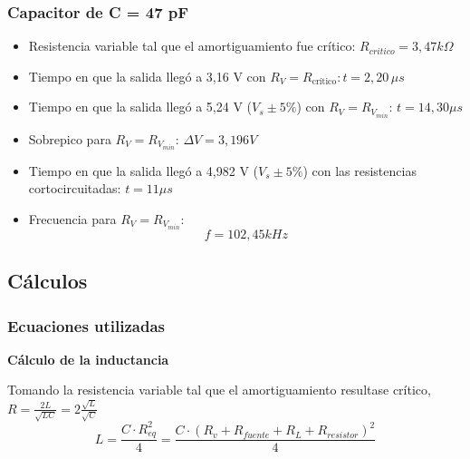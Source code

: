 \documentclass{article}
\begin{document}
        \par
        \subsubsection*{Capacitor de C = 47 pF}
            \begin{itemize}
                \item Resistencia variable tal que el amortiguamiento fue crítico: $ R_{critico} = 3,47 k\Omega $ %
                \item Tiempo en que la salida llegó a 3,16 V con $ R_V = R_{\text{crítico}} \colon t = 2,20 \, \mu s$ %
                \item Tiempo en que la salida llegó a 5,24 V ($V_s \pm 5\% $) con $ R_V=R_{V_{min}}$: $ t = 14,30 \mu s$ %
                \item Sobrepico para $R_V = R_{V_{min}}$: $ \Delta V = 3,196 V $
                \item Tiempo en que la salida llegó a 4,982 V ($V_s \pm 5\% $) con las resistencias cortocircuitadas: $ t = 11 \mu s$ %
                \item Frecuencia para $ R_V = R_{V_{min}} $:
                \begin{equation*}
                    f = 102,45 kHz
                \end{equation*} \par
            \end{itemize}

                
    \subsection{Cálculos}

        \subsubsection*{Ecuaciones utilizadas}            

            \textbf{Cálculo de la inductancia} \par
            Tomando la resistencia variable tal que el amortiguamiento resultase crítico,
            $ R = \frac{2L}{\sqrt{LC}} = 2\frac{\sqrt{L}}{\sqrt{C}} $
            \begin{equation}
                L = \frac{C \cdot R_{eq}^2}{4} = \frac{C \cdot (R_v+R_{fuente}+R_L+R_{resistor})^2}{4}
            \end{equation}
\end{document}
